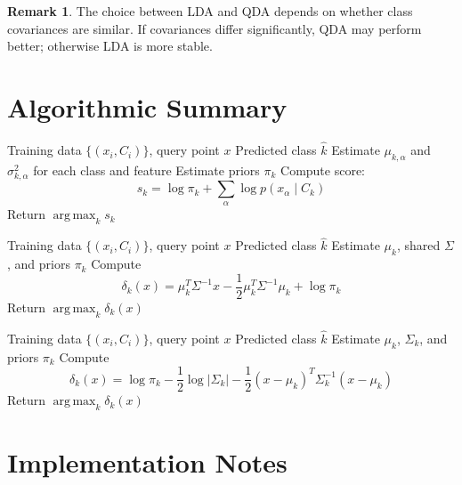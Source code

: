 \documentclass[12pt,oneside]{book}
\numberwithin{equation}{section}
\theoremstyle{definition}
\newtheorem{remark}{Remark}[section]
\theoremstyle{plain}
\theoremstyle{remark}
\newcommand{\argmax}{\operatorname*{arg\,max}}
\begin{document}
\begin{remark}
The choice between LDA and QDA depends on whether class covariances are similar. If covariances differ significantly, QDA may perform better; otherwise LDA is more stable.
\end{remark}

\section{Algorithmic Summary}

\begin{algorithm}[H]
\caption{Gaussian Naive Bayes}
\begin{algorithmic}[1]
\Require Training data $\{(x_i,C_i)\}$, query point $x$
\Ensure Predicted class $\hat{k}$
\State Estimate $\mu_{k,\alpha}$ and $\sigma_{k,\alpha}^2$ for each class and feature
\State Estimate priors $\pi_k$
    \State Compute score:
    \[
    s_k = \log \pi_k + \sum_\alpha \log p(x_\alpha \mid C_k)
    \]
\EndFor
\State Return $\argmax_k s_k$
\end{algorithmic}
\end{algorithm}

\begin{algorithm}[H]
\caption{LDA Classification}
\begin{algorithmic}[1]
\Require Training data $\{(x_i,C_i)\}$, query point $x$
\Ensure Predicted class $\hat{k}$
\State Estimate $\mu_k$, shared $\Sigma$, and priors $\pi_k$
    \State Compute
    \[
    \delta_k(x)
    =
    \mu_k^T\Sigma^{-1}x
    -
    \frac{1}{2}\mu_k^T\Sigma^{-1}\mu_k
    +
    \log \pi_k
    \]
\EndFor
\State Return $\argmax_k \delta_k(x)$
\end{algorithmic}
\end{algorithm}

\begin{algorithm}[H]
\caption{QDA Classification}
\begin{algorithmic}[1]
\Require Training data $\{(x_i,C_i)\}$, query point $x$
\Ensure Predicted class $\hat{k}$
\State Estimate $\mu_k$, $\Sigma_k$, and priors $\pi_k$
    \State Compute
    \[
    \delta_k(x)
    =
    \log \pi_k
    -
    \frac{1}{2}\log|\Sigma_k|
    -
    \frac{1}{2}(x-\mu_k)^T\Sigma_k^{-1}(x-\mu_k)
    \]
\EndFor
\State Return $\argmax_k \delta_k(x)$
\end{algorithmic}
\end{algorithm}

\section{Implementation Notes}
\end{document}
